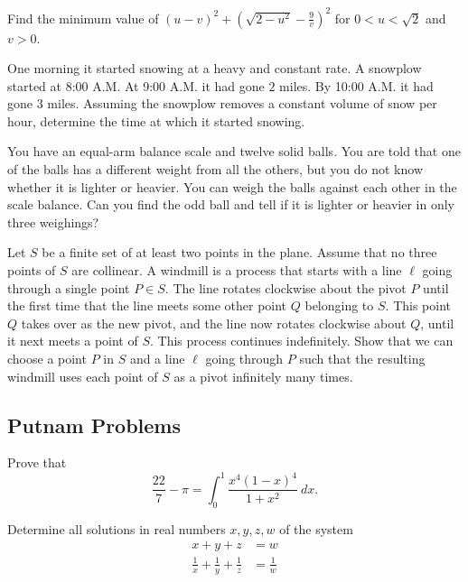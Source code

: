 \documentclass[12pt]{article}
\begin{document}
    \begin{exercise}
        Find the minimum value of $(u-v)^2+(\sqrt{2-u^2}-\frac{9}{v})^2$ for $0<u<\sqrt{2}$ and $v>0$.
    \end{exercise}
        
    \begin{exercise}
        One morning it started snowing at a heavy and constant rate. A snowplow started at 8:00 A.M. At 9:00 A.M. it had gone $2$ miles. By 10:00 A.M. it had gone $3$ miles. Assuming the snowplow removes a constant volume of snow per hour, determine the time at which it started snowing.
    \end{exercise}

    \begin{exercise}
        You have an equal-arm balance scale and twelve solid balls. You are told that one of the balls has a different weight from all the others, but you do not know whether it is lighter or heavier. You can weigh the balls against each other in the scale balance. Can you find the odd ball and tell if it is lighter or heavier in only three weighings?
    \end{exercise}

    \begin{exercise}
        Let $S$ be a finite set of at least two points in the plane. Assume that no three points of $S$ are collinear. A windmill is a process that starts with a line $\ell$ going through a single point $P \in S$. The line rotates clockwise about the pivot $P$ until the first time that the line meets some other point $Q$ belonging to $S$. This point $Q$ takes over as the new pivot, and the line now rotates clockwise about $Q$, until it next meets a point of $S$. This process continues indefinitely. Show that we can choose a point $P$ in $S$ and a line $\ell$ going through $P$ such that the resulting windmill uses each point of $S$ as a pivot infinitely many times.
    \end{exercise}

    \subsection{Putnam Problems}

    \begin{exercise}[1968 A1]
        Prove that
        \[\frac{22}{7}-\pi = \int_0^1\frac{x^4(1-x)^4}{1+x^2}\ dx.\]
    \end{exercise}

    \begin{exercise}[1977 A2]
        Determine all solutions in real numbers $x,y,z,w$ of the system
        \begin{align*}
            x+y+z&= w \\
            \frac{1}{x}+\frac{
            1}{y}+\frac{1}{z} &= \frac{1}{w}
        \end{align*}
    \end{exercise}
\end{document}
